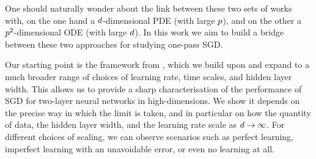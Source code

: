 \documentclass[10pt]{article}
\begin{document}
One should naturally wonder about the link between these two sets of works with, on the one hand a $d$-dimensional PDE (with large $p$), and on the other a $p^2$-dimensional ODE (with large $d$). In this work we aim to build a bridge between these two approaches for studying one-pass SGD. 

Our starting point is the framework from \cite{saad_1995}, which we build upon and expand to a much broader range of choices of learning rate, time scales, and hidden layer width. This allows us to provide a sharp characterisation of the performance of SGD for two-layer neural networks in high-dimensions. We show it depends on the precise way in which the limit is taken, and in particular on how the quantity of data, the hidden layer width, and the learning rate scale as $d \to \infty$. For different choices of scaling, we can observe scenarios such as perfect learning, imperfect learning with an unavoidable error, or even no learning at all. 

 
 
\end{document}
